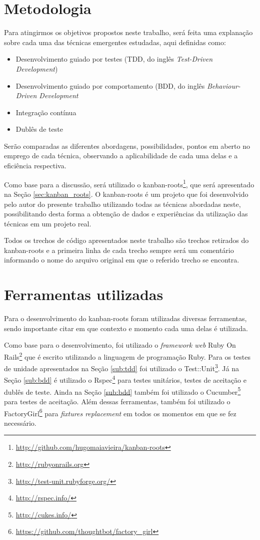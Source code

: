 \section{Metodologia}

Para atingirmos os objetivos propostos neste trabalho, será feita uma explanação sobre cada uma das técnicas emergentes estudadas, aqui definidas como:

\begin{itemize}
  \item Desenvolvimento guiado por testes (TDD, do inglês \textit{Test-Driven Development})
  \item Desenvolvimento guiado por comportamento (BDD, do inglês \textit{Behaviour-Driven Development}
  \item Integração contínua
  \item Dublês de teste
\end{itemize}

Serão comparadas as diferentes abordagens, possibilidades, pontos em aberto no emprego de cada técnica, observando a aplicabilidade de cada uma delas e a eficiência respectiva.

Como base para a discussão, será utilizado o kanban-roots\footnote{\url{http://github.com/hugomaiavieira/kanban-roots}}, que será apresentado na Seção \ref{sec:kanban_roots}. O kanban-roots é um projeto que foi desenvolvido pelo autor do presente trabalho utilizando todas as técnicas abordadas neste, possibilitando desta forma a obtenção de dados e experiências da utilização das técnicas em um projeto real.

Todos os trechos de código apresentados neste trabalho são trechos retirados do kanban-roots e a primeira linha de cada trecho sempre será um comentário informando o nome do arquivo original em que o referido trecho se encontra.

\section{Ferramentas utilizadas}

Para o desenvolvimento do kanban-roots foram utilizadas diversas ferramentas, sendo importante citar em que contexto e momento cada uma delas é utilizada.

Como base para o desenvolvimento, foi utilizado o \textit{framework web} Ruby On Rails\footnote{\url{http://rubyonrails.org}} que é escrito utilizando a linguagem de programação Ruby. Para os testes de unidade apresentados na Seção \ref{sub:tdd} foi utilizado o Test::Unit\footnote{\url{http://test-unit.rubyforge.org/}}. Já na Seção \ref{sub:bdd} é utilizado o Rspec\footnote{\url{http://rspec.info/}} para testes unitários, testes de aceitação e dublês de teste. Ainda na Seção \ref{sub:bdd} também foi utilizado o Cucumber\footnote{\url{http://cukes.info/}} para testes de aceitação. Além dessas ferramentas, também foi utilizado o FactoryGirl\footnote{\url{https://github.com/thoughtbot/factory_girl}} para \textit{fixtures replacement} em todos os momentos em que se fez necessário.

